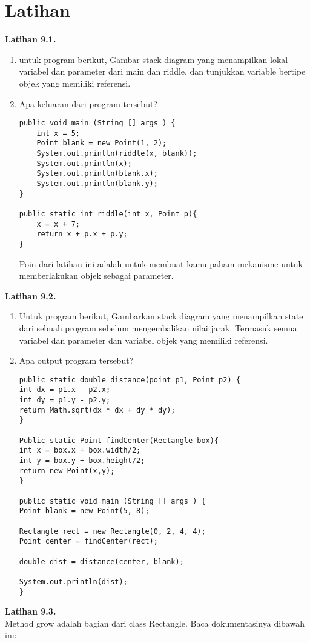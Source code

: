 \section{Latihan}
\textbf{Latihan 9.1.}\\
\begin{enumerate}
\item untuk program berikut, Gambar stack diagram yang menampilkan lokal variabel dan parameter dari main dan riddle, dan tunjukkan variable bertipe objek yang memiliki referensi.
\item Apa keluaran dari program tersebut?
\begin{lstlisting}
public void main (String [] args ) {
	int x = 5;
	Point blank = new Point(1, 2);
	System.out.println(riddle(x, blank));
	System.out.println(x);
	System.out.println(blank.x);
	System.out.println(blank.y);
}

public static int riddle(int x, Point p){
	x = x + 7;
	return x + p.x + p.y;
}
\end{lstlisting}
Poin dari latihan ini adalah untuk membuat kamu paham mekanisme untuk memberlakukan objek sebagai parameter.
\end{enumerate}
\textbf{Latihan 9.2.}\\
\begin{enumerate}
\item Untuk program berikut, Gambarkan stack diagram yang menampilkan state dari sebuah program sebelum mengembalikan nilai jarak. Termasuk semua variabel dan parameter dan variabel objek yang memiliki referensi.
\item Apa output program tersebut?
\begin{lstlisting}
public static double distance(point p1, Point p2) {
int dx = p1.x - p2.x;
int dy = p1.y - p2.y;
return Math.sqrt(dx * dx + dy * dy);
}

Public static Point findCenter(Rectangle box){
int x = box.x + box.width/2;
int y = box.y + box.height/2;
return new Point(x,y);
}

public static void main (String [] args ) {
Point blank = new Point(5, 8);

Rectangle rect = new Rectangle(0, 2, 4, 4);
Point center = findCenter(rect);

double dist = distance(center, blank);

System.out.println(dist);
}
\end{lstlisting}
\end{enumerate}
\textbf{Latihan 9.3.}\\
Method grow adalah bagian dari class Rectangle. Baca dokumentasinya  dibawah ini:
